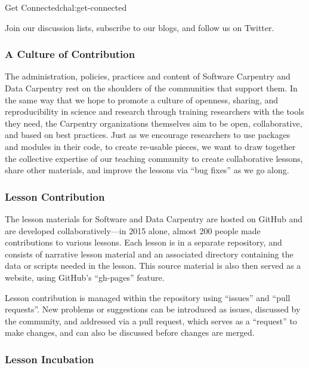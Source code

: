 \begin{challenge}{Get Connected}{chal:get-connected}

Join our discussion lists, subscribe to our blogs, and follow us on
Twitter.
\end{challenge}

\subsubsection{A Culture of
Contribution}\label{a-culture-of-contribution}

The administration, policies, practices and content of Software
Carpentry and Data Carpentry rest on the shoulders of the communities
that support them. In the same way that we hope to promote a culture of
openness, sharing, and reproducibility in science and research through
training researchers with the tools they need, the Carpentry
organizations themselves aim to be open, collaborative, and based on
best practices. Just as we encourage researchers to use packages and
modules in their code, to create re-usable pieces, we want to draw
together the collective expertise of our teaching community to create
collaborative lessons, share other materials, and improve the lessons
via ``bug fixes'' as we go along.

\subsubsection{Lesson Contribution}\label{lesson-contribution}

The lesson materials for Software and Data Carpentry are hosted on
GitHub
and are developed collaboratively---in 2015 alone, almost 200 people
made contributions to various lessons. Each lesson is in a separate
repository, and consists of narrative lesson material and an associated
directory containing the data or scripts needed in the lesson. This
source material is also then served as a website, using GitHub's
``gh-pages'' feature.

Lesson contribution is managed within the repository using ``issues''
and ``pull requests''. New problems or suggestions can be introduced as
issues, discussed by the community, and addressed via a pull request,
which serves as a ``request'' to make changes, and can also be discussed
before changes are merged.

\subsubsection{Lesson Incubation}\label{lesson-incubation}

